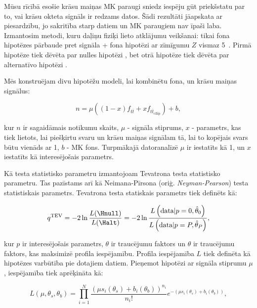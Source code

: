 \label{subsec:hypo_testing}

Mūsu rīcībā esošie krāsu maiņas MK paraugi sniedz iespēju gūt priekšstatu par to, vai krāsu okteta \PW signāls ir redzams datos. Šādi rezultāti jāapskata ar piesardzību, jo sakritība starp datiem un MK paraugiem nav īpaši laba. Izmantosim metodi, kuru daļiņu fiziķi lieto atklājumu veikšanai: tikai fona hipotēzes pārbaude pret signāla + fona hipotēzi ar zīmīgumu $Z$ vismaz 5~\cite{Cowan:2010js}. Pirmā hipotēze tiek dēvēta par nulles hipotēzi \Hnull, bet otrā hipotēze tiek dēvēta par alternatīvo hipotēzi \Halt.

Mēs konstruējam divu hipotēžu modeli, lai kombinētu fona, \ttbar un krāsu maiņas \ttbar signālus:

\begin{equation}
  n=\mu\left(\left(1-x\right)f_{t\overline{t}} + xf_{t\overline{t}_{\text{cflip}}}\right) + b,
  \label{eq:two_hypo_model}
\end{equation}

\noindent kur $n$ ir sagaidāmais notikumu skaits, $\mu$ - signāla stiprums, $x$  - parametrs, kas tiek lietots, lai piešķirtu svaru \ttbar un krāsu maiņas \ttbar signālam tā, lai to kopējais svars būtu vienāds ar 1, $b$ - MK fons. Turpmākajā datoranalīzē $\mu$ ir iestatīts kā 1, un $x$ iestatīts kā interesējošais parametrs.

Kā testa statistisko parametru izmantojoam Tevatrona testa statistisko parametru. Tas pazīstams arī kā Neimana-Pīrsona (oriģ. \textit{Neyman-Pearson}) testa statistiskais parametrs. Tevatrona testa statiskais parametrs tiek definēts kā:

\begin{equation}
  q^{\text{TEV}}=-2\ln{\frac{L(\Hnull)}{L(\Halt)}}=-2\ln{\frac{L\left(\text{data}|p=0,\hat{\theta}_{0}\right)}{L\left(\text{data}|p=P,\hat{\theta}_{P}\right)}},
\end{equation}

\noindent kur $p$ ir interesējošais parametrs, $\theta$ ir traucējumu faktors un $\hat{\theta}$ ir traucējumu faktors, kas maksimizē profila iespējamību. Profila iespējamība $L$ tiek definēta kā hipotēzes varbūtība pie dotajiem datiem. Pieņemot hipotēzi ar signāla stiprumu $\mu$, iespējamība tiek aprēķināta kā:

\begin{equation}
  L\left(\mu, \theta_{s}, \theta_{b}\right) = \prod_{i=1}^{N}\frac{\left(\mu s_{i}\left(\theta_{s}\right) + b_{i}\left(\theta_{b}\right)\right)^{n_{i}}}{n_{i}!}e^{-\left(\mu s_{i}\left(\theta_{s}\right) + b_{i}\left(\theta_{b}\right)\right)},
\end{equation}

